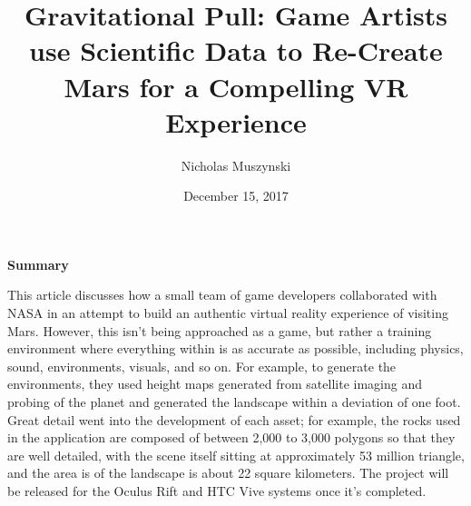 \documentclass{article}
\begin{document}
\title{Gravitational Pull: Game Artists use Scientific Data to Re-Create Mars for a Compelling VR Experience}
\author{Nicholas Muszynski}
\date{December 15, 2017}

\maketitle

\textbf{Summary}
\newline

This article discusses how a small team of game developers collaborated with NASA in an attempt to build an authentic virtual reality experience of visiting Mars. However, this isn't being approached as a game, but rather a training environment where everything within is as accurate as possible, including physics, sound, environments, visuals, and so on. For example, to generate the environments, they used height maps generated from satellite imaging and probing of the planet and generated the landscape within a deviation of one foot. Great detail went into the development of each asset; for example, the rocks used in the application are composed of between 2,000 to 3,000 polygons so that they are well detailed, with the scene itself sitting at approximately 53 million triangle, and the area is of the landscape is about 22 square kilometers. The project will be released for the Oculus Rift and HTC Vive systems once it's completed.

\nocite{marsCite}



\end{document}
